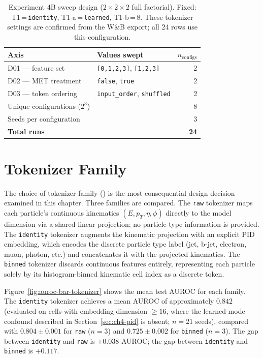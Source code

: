\begin{table}[h]
\centering
\small
\begin{tabular}{llr}
\toprule
Axis & Values swept & $n_\text{configs}$ \\
\midrule
D01 — feature set & \texttt{[0,1,2,3]}, \texttt{[1,2,3]} & 2 \\
D02 — MET treatment & \texttt{false}, \texttt{true} & 2 \\
D03 — token ordering & \texttt{input\_order}, \texttt{shuffled} & 2 \\
\midrule
Unique configurations ($2^3$) & & 8 \\
Seeds per configuration & & 3 \\
\textbf{Total runs} & & \textbf{24} \\
\bottomrule
\end{tabular}
\caption{Experiment 4B sweep design ($2\times2\times2$ full factorial).
Fixed: T1\,=\,\texttt{identity}, T1-a\,=\,\texttt{learned}, T1-b\,=\,8.
These tokenizer settings are confirmed from the W\&B export; all 24 rows use this configuration.}
\label{tab:exp4b}
\end{table}

\section{Tokenizer Family}
\label{sec:ch4-tokenizer}

The choice of tokenizer family () is the most consequential design decision examined in this chapter.
Three families are compared.
The \texttt{raw} tokenizer maps each particle's continuous kinematics $(E, p_T, \eta, \phi)$ directly to the model dimension via a shared linear projection; no particle-type information is provided.
The \texttt{identity} tokenizer augments the kinematic projection with an explicit PID embedding, which encodes the discrete particle type label (jet, b-jet, electron, muon, photon, etc.) and concatenates it with the projected kinematics.
The \texttt{binned} tokenizer discards continuous features entirely, representing each particle solely by its histogram-binned kinematic cell index as a discrete token.

Figure~\ref{fig:auroc-bar-tokenizer} shows the mean test AUROC for each family.
The \texttt{identity} tokenizer achieves a mean AUROC of approximately $0.842$ (evaluated on cells with embedding dimension $\geq 16$, where the learned-mode confound described in Section~\ref{sec:ch4-pid} is absent; $n=21$ seeds), compared with $0.804 \pm 0.001$ for \texttt{raw} ($n=3$) and $0.725 \pm 0.002$ for \texttt{binned} ($n=3$).
The gap between \texttt{identity} and \texttt{raw} is $+0.038$ AUROC; the gap between \texttt{identity} and \texttt{binned} is $+0.117$.


